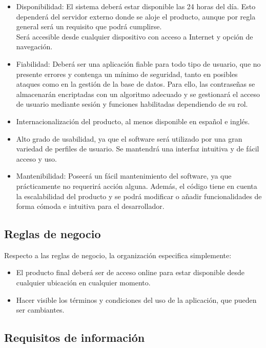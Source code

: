 \begin{itemize}
\item Disponibilidad: El sistema deberá estar disponible las 24 horas del día. Esto dependerá del servidor externo donde se aloje el producto, aunque por regla general será un requisito que podrá cumplirse. \\
Será accesible desde cualquier dispositivo con acceso a Internet y opción de navegación.
\item Fiabilidad: Deberá ser una aplicación fiable para todo tipo de usuario, que no presente errores y contenga un mínimo de seguridad, tanto en posibles ataques como en la gestión de la base de datos. Para ello, las contraseñas se almacenarán encriptadas con un algoritmo adecuado y se gestionará el acceso de usuario mediante sesión y funciones habilitadas dependiendo de su rol. 
\item Internacionalización del producto, al menos disponible en español e inglés.
\item Alto grado de usabilidad, ya que el software será utilizado por una gran variedad de perfiles de usuario. Se mantendrá una interfaz intuitiva y de fácil acceso y uso.
\item Mantenibilidad:  Poseerá un fácil mantenimiento del software, ya que prácticamente no requerirá acción alguna. Además, el código tiene en cuenta la escalabilidad del producto y se podrá modificar o añadir funcionalidades de forma cómoda e intuitiva para el desarrollador.  
\end{itemize}


\subsection{Reglas de negocio}

Respecto a las reglas de negocio, la organización especifica simplemente: 

\begin{itemize}
\item El producto final deberá ser de acceso online para estar disponible desde cualquier ubicación en cualquier momento.
\item Hacer visible los términos y condiciones del uso de la aplicación, que pueden ser cambiantes.
\end{itemize}


\subsection{Requisitos de información}

